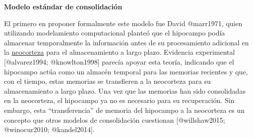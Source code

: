 \documentclass[
  11pt]{../MastersDoctoralThesisUNAM}
\begin{document}
\begin{tcolorbox}[enhanced jigsaw, colframe=quarto-callout-warning-color-frame, left=2mm, bottomrule=.15mm, rightrule=.15mm, arc=.35mm, toprule=.15mm, leftrule=.75mm, breakable, opacityback=0, colback=white]

\vspace{-3mm}\textbf{\textbf{Modelo estándar de consolidación}}\vspace{3mm}

El primero en proponer formalmente este modelo fue David @marr1971,
quien utilizando modelamiento computacional planteó que el hipocampo
podía almacenar temporalmente la información antes de su procesamiento
adicional en la \href{AppendixB.qmd\#term-id-68}{neocorteza} para el
almacenamiento a largo plazo. Evidencia experimental {[}@alvarez1994;
@knowlton1998{]} parecía apoyar esta teoría, indicando que el hipocampo
actúa como un almacén temporal para las memorias recientes y que, con el
tiempo, estas memorias se transfieren a la neocorteza para su
almacenamiento a largo plazo. Una vez que las memorias han sido
consolidadas en la neocorteza, el hipocampo ya no es necesario para su
recuperación. Sin embargo, esta ``transferencia'' de memoria del
hipocampo a la neocorteza es un concepto que otros modelos de
consolidación cuestionan {[}@willshaw2015; @winocur2010; @kandel2014{]}.

\end{tcolorbox}
\end{document}
